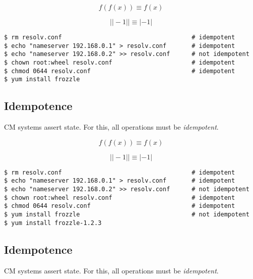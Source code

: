 \documentclass[xga]{xdvislides}
\begin{document}
\begin{displaymath}
f(f(x)) \equiv f(x)
\end{displaymath}

\begin{displaymath}
| |-1| | \equiv |-1|
\end{displaymath}

\begin{verbatim}
$ rm resolv.conf                                    # idempotent
$ echo "nameserver 192.168.0.1" > resolv.conf       # idempotent
$ echo "nameserver 192.168.0.2" >> resolv.conf      # not idempotent
$ chown root:wheel resolv.conf                      # idempotent
$ chmod 0644 resolv.conf                            # idempotent
$ yum install frozzle
\end{verbatim}


\subsection{Idempotence}
CM systems assert state.  For this, all operations
must be {\em idempotent}. \\
\vspace{.5in}

\begin{displaymath}
f(f(x)) \equiv f(x)
\end{displaymath}

\begin{displaymath}
| |-1| | \equiv |-1|
\end{displaymath}

\begin{verbatim}
$ rm resolv.conf                                    # idempotent
$ echo "nameserver 192.168.0.1" > resolv.conf       # idempotent
$ echo "nameserver 192.168.0.2" >> resolv.conf      # not idempotent
$ chown root:wheel resolv.conf                      # idempotent
$ chmod 0644 resolv.conf                            # idempotent
$ yum install frozzle                               # not idempotent
$ yum install frozzle-1.2.3
\end{verbatim}

\subsection{Idempotence}
CM systems assert state.  For this, all operations
must be {\em idempotent}. \\
\vspace{.5in}
\end{document}
